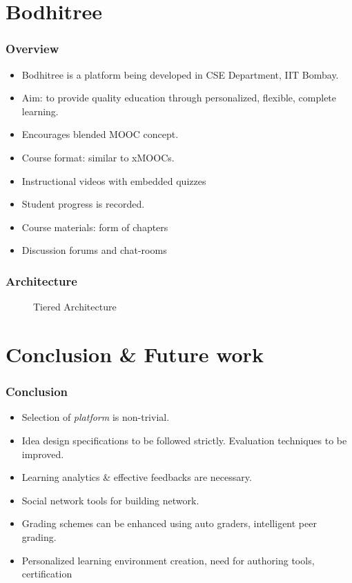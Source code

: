 \documentclass[13pt]{beamer}
\begin{document}
\section{Bodhitree}
\begin{frame}
\frametitle{Overview}
    \begin{itemize}
     \item Bodhitree is a platform being developed in CSE Department, IIT Bombay.
     \item Aim: to provide quality education through personalized, flexible, complete learning.
     \item Encourages blended MOOC concept.
     \item Course format: similar to xMOOCs.
     \item Instructional videos with embedded quizzes
     \item Student progress is recorded. 
     \item Course materials: form of chapters
     \item Discussion forums and chat-rooms
    \end{itemize}
\end{frame}
\begin{frame}
\frametitle{Architecture}    
\begin{figure}[ht]
\begin{center}
\end{center}
\caption{Tiered Architecture}\label{fig:arch}
\end{figure}
\end{frame}

\section{Conclusion \& Future work}
\begin{frame}
	\frametitle{Conclusion}
	\begin{itemize}
	  \item Selection of \textit{platform} is non-trivial.
	  \item Idea design specifications to be followed strictly. Evaluation techniques to be improved.
	  \item Learning analytics \& effective feedbacks are necessary.
	  \item Social network tools for building network.
	  \item Grading schemes can be enhanced using auto graders, intelligent peer grading.
	  \item Personalized learning environment creation, need for authoring tools, certification 
	\end{itemize}
\end{frame}
\end{document}
